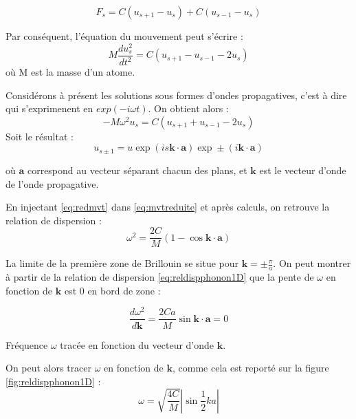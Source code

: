 \begin{equation}
F_s = C(u_{s+1} - u_s) + C (u_{s-1} - u_s)
\end{equation}

Par conséquent, l'équation du mouvement peut s'écrire :
\begin{equation}
M \frac{du_s^2}{dt^2} = C (u_{s+1} -u_{s-1} - 2 u_s)
\end{equation}
où M est la masse d'un atome.

Considérons à présent les solutions sous formes d'ondes propagatives, c'est à
dire qui s'exprimenent en $exp(-i\omega t)$. On obtient alors :
\begin{equation}
-M\omega^2 u_s = C (u_{s+1} + u_{s-1} - 2u_s )
\label{eq:mvtreduite}
\end{equation}
Soit le résultat :
\begin{equation}
u_{s\pm 1} = u \exp(is\mathbf{k}\cdot\mathbf{a}) \exp \pm (i\mathbf{k}\cdot
\mathbf{a})
\label{eq:redmvt}
\end{equation}

où $\mathbf{a}$ correspond au vecteur séparant chacun des plans, et $\mathbf{k}$
est le vecteur d'onde de l'onde propagative.

En injectant \ref{eq:redmvt} dans \ref{eq:mvtreduite} et après calculs, on
retrouve la relation de dispersion :
\begin{equation}
    \omega^2 = \frac{2C}{M}\left(1-\cos \mathbf{k}\cdot\mathbf{a}\right)
    \label{eq:reldispphonon1D}
\end{equation}

La limite de la première zone de Brillouin se situe pour 
$\mathbf{k} = \pm \frac{\pi}{a}$. On peut montrer à partir de la relation de
dispersion \ref{eq:reldispphonon1D} que la pente de $\omega$ en fonction de
$\mathbf{k}$ est 0 en bord de zone :

\begin{equation}
\frac{d\omega^2}{d\mathbf{k}} = \frac{2Ca}{M} \sin \mathbf{k}\cdot\mathbf{a} = 0
\end{equation}

\begin{marginfigure}
\TODO
\caption{Fréquence $\omega$ tracée en fonction du vecteur d'onde $\mathbf{k}$.}
\label{fig:reldispphonon1D}
\end{marginfigure}

On peut alors tracer $\omega$ en fonction de $\mathbf{k}$, comme cela est reporté
sur la figure \ref{fig:reldispphonon1D} :
\begin{equation}
\omega = \sqrt{\frac{4C}{M}} \left| \sin \frac{1}{2} ka \right|
\end{equation}

